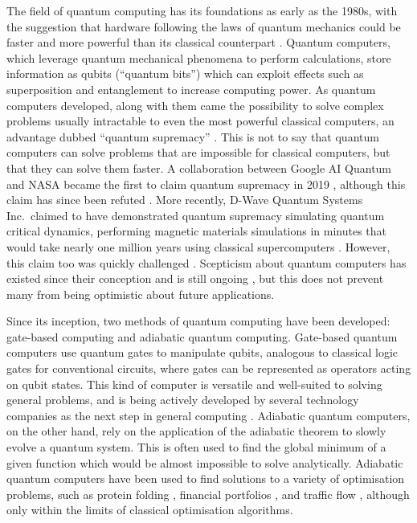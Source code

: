 \documentclass[12pt]{article}
\theoremstyle{definition}
\begin{document}
The field of quantum computing has its foundations as early as the 1980s, with the suggestion that hardware following the laws of quantum mechanics could be faster and more powerful than its classical counterpart \cite{feynman_simulating_1982}.
Quantum computers, which leverage quantum mechanical phenomena to perform calculations, store information as qubits (``quantum bits'') which can exploit effects such as superposition and entanglement to increase computing power.
As quantum computers developed, along with them came the possibility to solve complex problems usually intractable to even the most powerful classical computers, an advantage dubbed ``quantum supremacy'' \cite{preskill_supremacy_2012}. This is not to say that quantum computers can solve problems that are impossible for classical computers, but that they can solve them faster. A collaboration between Google AI Quantum and NASA became the first to claim quantum supremacy in 2019 \cite{arute_quantum_2019}, although this claim has since been refuted \cites{pednault_leveraging_2019}{mccormick_race_2022}. More recently, D-Wave Quantum Systems Inc.\ claimed to have demonstrated quantum supremacy simulating quantum critical dynamics, performing magnetic materials simulations in minutes that would take nearly one million years using classical supercomputers \cite{king_beyond_2025}. However, this claim too was quickly challenged \cites{tindall_dynamics_2025}{mauron_challenging_2025}. Scepticism about quantum computers has existed since their conception \cite{unruh_maintaining_1995} and is still ongoing \cite{brooks_quantum_2023}, but this does not prevent many from being optimistic about future applications.

Since its inception, two methods of quantum computing have been developed: gate-based computing and adiabatic quantum computing.
Gate-based quantum computers use quantum gates to manipulate qubits, analogous to classical logic gates for conventional circuits, where gates can be represented as operators acting on qubit states. This kind of computer is versatile and well-suited to solving general problems, and is being actively developed by several technology companies as the next step in general computing \cites{google}{ibm}.
Adiabatic quantum computers, on the other hand, rely on the application of the adiabatic theorem to slowly evolve a quantum system. This is often used to find the global minimum of a given function which would be almost impossible to solve analytically. Adiabatic quantum computers have been used to find solutions to a variety of optimisation problems, such as protein folding \cite{perdomo-ortiz_protein_2012}, financial portfolios \cite{phillipson_portfolio_2021}, and traffic flow \cite{inoue_traffic_2021}, although only within the limits of classical optimisation algorithms.
\end{document}
